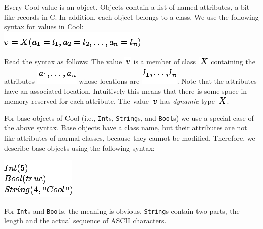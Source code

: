\documentclass[]{article}
\begin{document}
Every Cool value is an object. Objects contain a list of named
attributes, a bit like records in C. In addition, each object belongs to
a class. We use the following syntax for values in Cool: \\

\includegraphics{img140.png}

Read the syntax as follows: The value \includegraphics{img59.png} is a
member of class \includegraphics{img141.png} containing the attributes
\includegraphics{img142.png} whose locations are
\includegraphics{img143.png}. Note that the attributes have an
associated location. Intuitively this means that there is some space in
memory reserved for each attribute. The value
\includegraphics{img59.png} has \emph{dynamic} type
\includegraphics{img141.png}.

For base objects of Cool (i.e., \texttt{Int}s, \texttt{String}s, and
\texttt{Bool}s) we use a special case of the above syntax. Base objects
have a class name, but their attributes are not like attributes of
normal classes, because they cannot be modified. Therefore, we describe
base objects using the following syntax:

\includegraphics{img144.png}

For \texttt{Int}s and \texttt{Bool}s, the meaning is obvious.
\texttt{String}s contain two parts, the length and the actual sequence
of ASCII characters.
\end{document}
